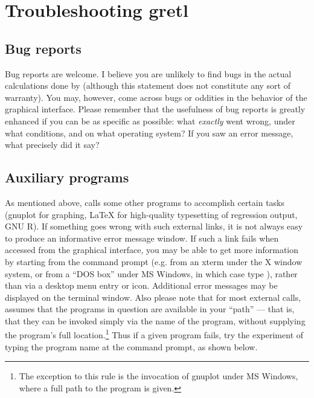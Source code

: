 \chapter{Troubleshooting gretl}
\label{trouble}



\section{Bug reports}
\label{trouble-bugs}


Bug reports are welcome. I believe you are unlikely to find bugs in
the actual calculations done by  (although this statement
does not constitute any sort of warranty). You may, however, come
across bugs or oddities in the behavior of the graphical interface.
Please remember that the usefulness of bug reports is greatly enhanced
if you can be as specific as possible: what \emph{exactly} went wrong,
under what conditions, and on what operating system?  If you saw an
error message, what precisely did it say?

\section{Auxiliary programs}
\label{trouble-programs}


As mentioned above,  calls some other programs to
accomplish certain tasks (gnuplot for graphing, {\LaTeX} for
high-quality typesetting of regression output, GNU R).  If something
goes wrong with such external links, it is not always easy to produce
an informative error message window.  If such a link fails when
accessed from the  graphical interface, you may be able to
get more information by starting  from the command prompt
(e.g.  from an xterm under the X window system, or from a ``DOS box''
under MS Windows, in which case type ), rather than
via a desktop menu entry or icon.  Additional error messages may be
displayed on the terminal window.  Also please note that for most
external calls,  assumes that the programs in question are
available in your ``path'' --- that is, that they can be invoked
simply via the name of the program, without supplying the program's
full location.\footnote{The exception to this rule is the invocation
  of gnuplot under MS Windows, where a full path to the program is
  given.}  Thus if a given program fails, try the experiment of typing
the program name at the command prompt, as shown below.

